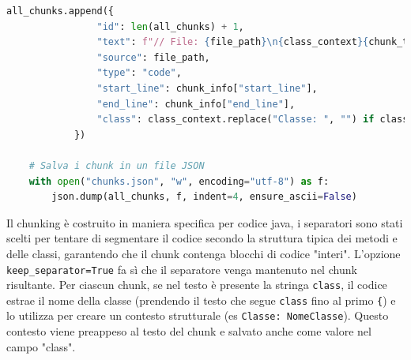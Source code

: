 \documentclass[12pt,a4paper,openright,twoside]{book}
\begin{document}
\begin{lstlisting}[language=Python, caption={Codice Python per la suddivisione dei file Java in chunk}, label={lst:chunking}]
            all_chunks.append({
                "id": len(all_chunks) + 1,
                "text": f"// File: {file_path}\n{class_context}{chunk_text}",
                "source": file_path,
                "type": "code",
                "start_line": chunk_info["start_line"],
                "end_line": chunk_info["end_line"],
                "class": class_context.replace("Classe: ", "") if class_context else ""
            })
    
    # Salva i chunk in un file JSON
    with open("chunks.json", "w", encoding="utf-8") as f:
        json.dump(all_chunks, f, indent=4, ensure_ascii=False)
\end{lstlisting}
Il chunking è costruito in maniera specifica per codice java, i separatori sono stati scelti per tentare di segmentare il codice secondo la struttura tipica dei metodi e delle classi, garantendo che il chunk contenga blocchi di codice "interi".
L'opzione \texttt{keep\_separator=True} fa sì che il separatore venga mantenuto nel chunk risultante.
Per ciascun chunk, se nel testo è presente la stringa \texttt{class}, il codice estrae il nome della classe 
(prendendo il testo che segue \texttt{class} fino al primo \texttt{\{}) e lo utilizza per creare un contesto 
strutturale (es \texttt{Classe: NomeClasse}).
Questo contesto viene preappeso al testo del chunk e salvato anche come valore nel campo "class".
\end{document}
